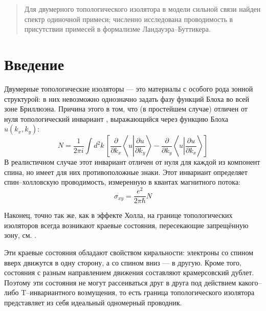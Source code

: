 	\newpage
	\begin{abstract}
        Для двумерного топологического изолятора в модели сильной связи найден 
        спектр одиночной примеси; численно исследована проводимость в присутствии примесей 
        в формализме Ландауэра--Буттикера.
	\end{abstract}
	\section{Введение}
    Двумерные топологические изоляторы --- это материалы 
    с особого рода зонной структурой:
    в них невозможно однозначно задать фазу функций 
    Блоха во всей зоне Бриллюэна. Причина этого в том, что (в простейшем случае) 
    отличен от нуля
    топологический инвариант \cite{Kohmoto1985, Thouless1982}, выражающийся через 
    функцию Блоха $u(k_x, k_y)$:
    \begin{equation}
        \label{TKNN}
        N = \frac{1}{2\pi i} 
            \int d^2 k\, \left[
                        \frac{\partial}{\partial k_x} \left\langle u \left| 
                        \frac{\partial u}{\partial k_y} \right.\right\rangle -
                        \frac{\partial}{\partial k_y} \left\langle u \left| 
                        \frac{\partial u}{\partial k_x} \right.\right\rangle 
                         \right]
    \end{equation}
    В реалистичном случае этот инвариант отличен от нуля для каждой из компонент спина,
    но имеет для них противоположные знаки.
    Этот инвариант определяет спин--холловскую проводимость, 
    измеренную в квантах 
    магнитного потока:
    \begin{equation}
        \sigma_{xy} = \frac{e^2}{2\pi \hbar} N
    \end{equation}
    
    Наконец, точно так же, как в эффекте Холла, 
    на границе топологических изоляторов всегда возникают краевые состояния,
    пересекающие запрещённую зону, см. \cite{Hasan2010}.

    Эти краевые состояния обладают свойством киральности: электроны со спином 
    вверх движутся в одну сторону, а со спином вниз --- в другую. Кроме того, состояния 
    с разным направлением движения составляют крамерсовский дублет. Поэтому
    эти состояния не могут рассеиваться друг в друга 
    под действием какого--либо T--инвариантного возмущения, то есть граница топологического 
    изолятора представляет из себя идеальный одномерный проводник.

